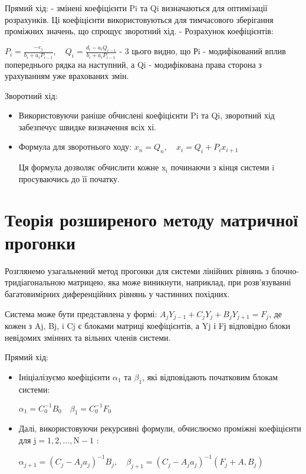 Прямий хід:
- змінені коефіцієнти Pi та Qi визначаються для оптимізації розрахунків. Ці коефіцієнти використовуються для тимчасового зберігання проміжних значень, що спрощує зворотний хід.
- Розрахунок коефіцієнтів:

$P_{i}=\frac{-c_{j}}{b_{i}+a_{i} P_{i-1}}, \quad Q_{i}=\frac{d_{i}-a_{i} Q_{i-1}}{b_{i}+a_{i} P_{i-1}}$
- 3 цього видно, що Рi - модифікований вплив попереднього рядка на наступний, а Qi - модифікована права сторона з урахуванням уже врахованих змін.

Зворотний хід:
\begin{itemize}
    \item Використовуючи раніше обчислені коефіцієнти Pi та Qi, зворотний хід забезпечує швидке визначення всіх хі.
    \item Формула для зворотнього ходу:
    $x_{n}=Q_{n}, \quad x_{i}=Q_{i}+P_{i} x_{i+1}$
    
    
    Ця формула дозволяє обчислити кожне $\mathrm{x}_{\mathrm{i}}$ починаючи з кінця системи $\mathrm{i}$ просуваючись до її початку.
\end{itemize}


\section{Теорія розширеного методу матричної прогонки}

Розглянемо узагальнений метод прогонки для системи лінійних рівнянь $з$ блочно-тридіагональною матрицею, яка може виникнути, наприклад, при розв'язуванні багатовимірних диференційних рівнянь у частинних похідних.


Система може бути представлена у формі:
$A_{j} Y_{j-1}+C_{j} Y_{j}+B_{j} Y_{j+1}=F_{j}$,
де кожен з Aj, Bj, i Cj є блоками матриці коефіцієнтів, а Yj і Fј відповідно блоки невідомих змінних та вільних членів системи.

\vspace{1cm}

Прямий хід:
\begin{itemize}
    \item Ініціалізуємо коефіцієнти $\alpha_1$ та $\beta_1$, які відповідають початковим блокам системи:


    $\alpha_{1}=C_{0}^{-1} B_{0} \quad \beta_{1}=C_{0}^{-1} F_{0}$


    \item Далі, використовуючи рекурсивні формули, обчислюємо проміжні коефіцієнти для $\mathrm{j}=1,2, \ldots, \mathrm{N}-1$ :


    $\alpha_{j+1}=\left(C_{j}-A_{j} a_{j}\right)^{-1} B_{j}, \quad \beta_{j+1}=\left(C_{j}-A_{j} a_{j}\right)^{-1}\left(F_{j}+A, B_{j}\right)$
\end{itemize}

